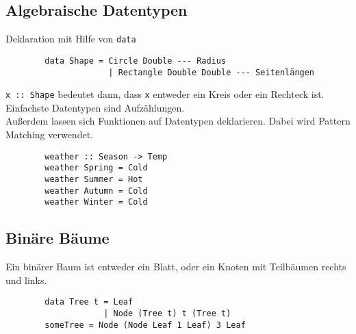 \documentclass[10pt,a4paper,draft]{article}
\def\code#1{\texttt{#1}}
\begin{document}
        \subsection{Algebraische Datentypen}
        Deklaration mit Hilfe von \code{data}
        \begin{lstlisting}
        data Shape = Circle Double --- Radius
                     | Rectangle Double Double --- Seitenlängen
      \end{lstlisting}
        \code{x :: Shape} bedeutet dann, dass \code{x} entweder ein Kreis oder ein Rechteck ist.
        Einfachste Datentypen sind Aufzählungen.\\
        Außerdem lassen sich Funktionen auf Datentypen deklarieren. Dabei wird Pattern Matching verwendet.
        \begin{lstlisting}
        weather :: Season -> Temp
        weather Spring = Cold
        weather Summer = Hot
        weather Autumn = Cold
        weather Winter = Cold
      \end{lstlisting}

        \subsection{Binäre Bäume}
        Ein binärer Baum ist entweder ein Blatt, oder ein Knoten mit Teilbäumen rechts und links.
        \begin{lstlisting}
        data Tree t = Leaf
                    | Node (Tree t) t (Tree t)
        someTree = Node (Node Leaf 1 Leaf) 3 Leaf 
      \end{lstlisting}
        

        
\end{document}
